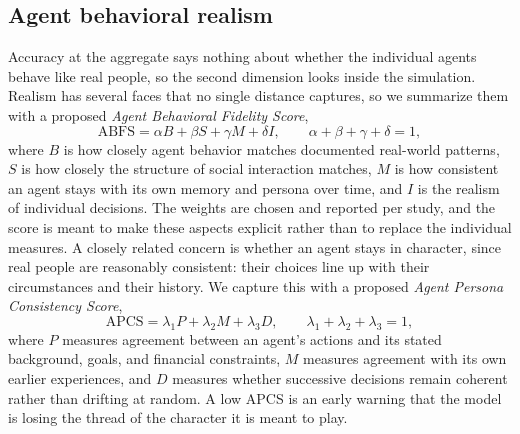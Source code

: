 \documentclass[conference]{IEEEtran}
\begin{document}
\subsection{Agent behavioral realism}
Accuracy at the aggregate says nothing about whether the individual agents behave like real people, so the second dimension looks inside the simulation. Realism has several faces that no single distance captures, so we summarize them with a proposed \emph{Agent Behavioral Fidelity Score},
\begin{equation}
\mathrm{ABFS} = \alpha B + \beta S + \gamma M + \delta I, \qquad \alpha + \beta + \gamma + \delta = 1,
\end{equation}
where $B$ is how closely agent behavior matches documented real-world patterns, $S$ is how closely the structure of social interaction matches, $M$ is how consistent an agent stays with its own memory and persona over time, and $I$ is the realism of individual decisions. The weights are chosen and reported per study, and the score is meant to make these aspects explicit rather than to replace the individual measures. A closely related concern is whether an agent stays in character, since real people are reasonably consistent: their choices line up with their circumstances and their history. We capture this with a proposed \emph{Agent Persona Consistency Score},
\begin{equation}
\mathrm{APCS} = \lambda_1 P + \lambda_2 M + \lambda_3 D, \qquad \lambda_1 + \lambda_2 + \lambda_3 = 1,
\end{equation}
where $P$ measures agreement between an agent's actions and its stated background, goals, and financial constraints, $M$ measures agreement with its own earlier experiences, and $D$ measures whether successive decisions remain coherent rather than drifting at random. A low APCS is an early warning that the model is losing the thread of the character it is meant to play.
\end{document}
